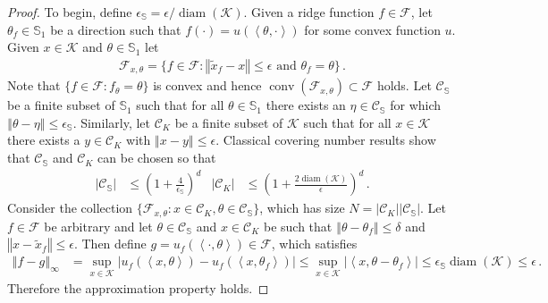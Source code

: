\documentclass[letter, 12pt]{report}
\newcommand{\ip}[1]{\left \langle #1 \right \rangle}
\newcommand{\sphere}{\mathbb{S}}
\newcommand{\norm}[1]{\left \Vert  #1 \right \Vert}
\newcommand{\cK}{\mathcal K}
\newcommand{\cC}{\mathcal C}
\newcommand{\sF}{\mathscr F}
\newcommand{\conv}{\operatorname{conv}}
\newcommand{\diam}{\operatorname{diam}}
\newcommand{\1}{\mathbf{1}}
\theoremstyle{plain}
\theoremstyle{definition}
\theoremstyle{remark}
\begin{document}
\begin{proof}
    To begin, define $\epsilon_{\mathbb S} = \epsilon/\diam(\cK)$.
    Given a ridge function $f \in \sF$, let $\theta_f \in \sphere_1$ be a direction such that $f(\cdot) = u(\ip{\theta, \cdot})$ for some convex function $u$.
    Given $x \in \cK$ and $\theta \in \sphere_1$ let
    \begin{align*}
        \sF_{x,\theta} = \{f \in \sF : \norm{\tilde x_f - x} \leq \epsilon \text{ and } \theta_f = \theta\} \,.
    \end{align*}
    Note that $\{f \in \sF : f_\theta = \theta\}$ is convex and hence $\conv(\sF_{x,\theta}) \subset \sF$ holds.
    Let $\cC_{\mathbb S}$ be a finite subset of $\sphere_1$ such that for all $\theta \in \sphere_1$ there exists an $\eta \in \cC_{\mathbb S}$
    for which $\norm{\theta - \eta} \leq \epsilon_{\mathbb S}$.
    Similarly, let $\cC_K$ be a finite subset of $\cK$ such that for all $x \in \cK$ there exists a $y \in \cC_K$ with $\norm{x - y} \leq \epsilon$.
    Classical covering number results \citep[\S4]{ASG15} show that $\cC_{\mathbb S}$ and $\cC_K$ can be chosen so that
    \begin{align*}
        |\cC_{\mathbb S}| & \leq \left(1 + \frac{4}{\epsilon_{\mathbb S}}\right)^d    &
        |\cC_K|           & \leq \left(1 + \frac{2 \diam(\cK)}{\epsilon}\right)^d \,.
    \end{align*}
    Consider the collection $\{\sF_{x,\theta} : x \in \cC_K, \theta \in \cC_{\mathbb S}\}$, which has size $N = |\cC_K| |\cC_{\mathbb S}|$.
    Let $f \in \sF$ be arbitrary and let $\theta \in \cC_{\mathbb S}$ and $x \in \cC_K$ be such that
    $\norm{\theta - \theta_f} \leq \delta$ and $\norm{x - \tilde x_f} \leq \epsilon$.
    Then define $g = u_f(\ip{\cdot, \theta}) \in \sF$, which satisfies
    \begin{align*}
        \norm{f - g}_\infty
         & = \sup_{x \in \cK} |u_f(\ip{x, \theta}) - u_f(\ip{x, \theta_f})|
        \leq \sup_{x \in \cK} |\ip{x, \theta - \theta_f}|
        \leq \epsilon_{\mathbb S} \diam(\cK)
        \leq \epsilon \,.
    \end{align*}
    Therefore the approximation property holds.
\end{proof}
\end{document}
